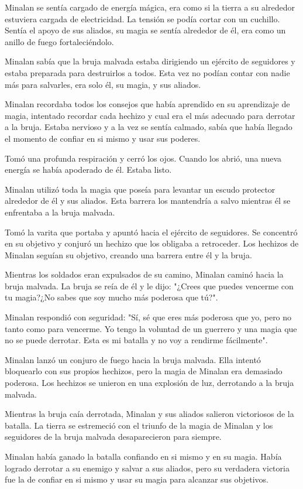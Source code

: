 
Minalan se sentía cargado de energía mágica, era como si la tierra a su alrededor estuviera cargada de electricidad. La tensión se podía cortar con un cuchillo. Sentía el apoyo de sus aliados, su magia se sentía alrededor de él, era como un anillo de fuego fortaleciéndolo.

Minalan sabía que la bruja malvada estaba dirigiendo un ejército de seguidores y estaba preparada para destruirlos a todos. Esta vez no podían contar con nadie más para salvarles, era solo él, su magia, y sus aliados.

Minalan recordaba todos los consejos que había aprendido en su aprendizaje de magia, intentado recordar cada hechizo y cual era el más adecuado para derrotar a la bruja. Estaba nervioso y a la vez se sentía calmado, sabía que había llegado el momento de confiar en si mismo y usar sus poderes.

Tomó una profunda respiración y cerró los ojos. Cuando los abrió, una nueva energía se había apoderado de él. Estaba listo.

Minalan utilizó toda la magia que poseía para levantar un escudo protector alrededor de él y sus aliados. Esta barrera los mantendría a salvo mientras él se enfrentaba a la bruja malvada.

Tomó la varita que portaba y apuntó hacia el ejército de seguidores. Se concentró en su objetivo y conjuró un hechizo que los obligaba a retroceder. Los hechizos de Minalan seguían su objetivo, creando una barrera entre él y la bruja.

Mientras los soldados eran expulsados de su camino, Minalan caminó hacia la bruja malvada. La bruja se reía de él y le dijo: "¿Crees que puedes vencerme con tu magia?¿No sabes que soy mucho más poderosa que tú?". 

Minalan respondió con seguridad: "Sí, sé que eres más poderosa que yo, pero no tanto como para vencerme. Yo tengo la voluntad de un guerrero y una magia que no se puede derrotar. Esta es mi batalla y no voy a rendirme fácilmente". 

Minalan lanzó un conjuro de fuego hacia la bruja malvada. Ella intentó bloquearlo con sus propios hechizos, pero la magia de Minalan era demasiado poderosa. Los hechizos se unieron en una explosión de luz, derrotando a la bruja malvada. 

Mientras la bruja caía derrotada, Minalan y sus aliados salieron victoriosos de la batalla. La tierra se estremeció con el triunfo de la magia de Minalan y los seguidores de la bruja malvada desaparecieron para siempre. 

Minalan había ganado la batalla confiando en si mismo y en su magia. Había logrado derrotar a su enemigo y salvar a sus aliados, pero su verdadera victoria fue la de confiar en si mismo y usar su magia para alcanzar sus objetivos.